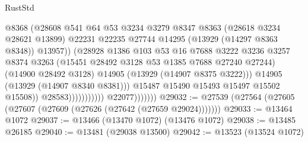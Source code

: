 \begin{lexlean}{RustStd}
\begin{coremodule}
                                                @8368
                                                (@28608
                                                  @541
                                                  @64
                                                  @53
                                                  @3234
                                                  @3279
                                                  @8347
                                                  @8363
                                                  (@28618 @3234 @28621 @13899)
                                                  @22231
                                                  @22235
                                                  @27744
                                                  @14295
                                                  (@13929 (@14297 @8363 @8348))
                                                  @13957))
                                              (@28928
                                                @1386
                                                @103
                                                @53
                                                @16
                                                @7688
                                                @3222
                                                @3236
                                                @3257
                                                @8374
                                                @3263
                                                (@15451 @28492 @3128 @53 @1385 @7688 @27240 @27244)
                                                (@14900 @28492 @3128)
                                                @14905
                                                (@13929 (@14907 @8375 @3222)))
                                              @14905
                                              (@13929 (@14907 @8340 @8381)))
                                            @15487
                                            @15490
                                            @15493
                                            @15497
                                            @15502
                                            @15508))
                                        @28583)))))))))))
                  @22077)))))))
@29032 := @27539 (@27564 (@27605 (@27607 (@27609 (@27626 (@27642 (@27659 @29024)))))))
@29033 := @13464 @1072
@29037 := @13466 (@13470 @1072) (@13476 @1072)
@29038 := @13485 @26185
@29040 := @13481 (@29038 @13500)
@29042 := @13523 (@13524 @1072)

\end{coremodule}
\end{lexlean}
